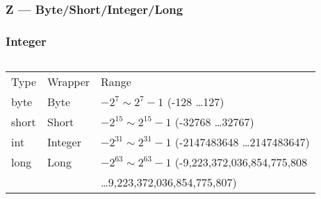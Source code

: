 \documentclass[en, 11pt, xcolor=dvipsnames]{beamer}
\begin{document}
\subsubsection{Z --- Byte/Short/Integer/Long}
\begin{frame}[fragile]
	\frametitle{Integer}


	\begin{columns}[c]
		\begin{column}{0.9\textwidth}

			\begin{table}
				\begin{tabular}{l l l}
					Type  & Wrapper & Range                                                      \\
					byte  & Byte    & $ -2^{7} \sim 2^{7} - 1 $ (-128 \dots 127)                 \\
					short & Short   & $ -2^{15} \sim 2^{15} - 1 $ (-32768 \dots 32767)           \\
					int   & Integer & $ -2^{31} \sim 2^{31} - 1 $ (-2147483648 \dots 2147483647) \\
					long  & Long    & $ -2^{63} \sim 2^{63} - 1 $ (-9,223,372,036,854,775,808    \\
					      &         & \dots 9,223,372,036,854,775,807)                           \\
				\end{tabular}
			\end{table}


\end{column}
\end{columns}
\end{frame}
\end{document}
